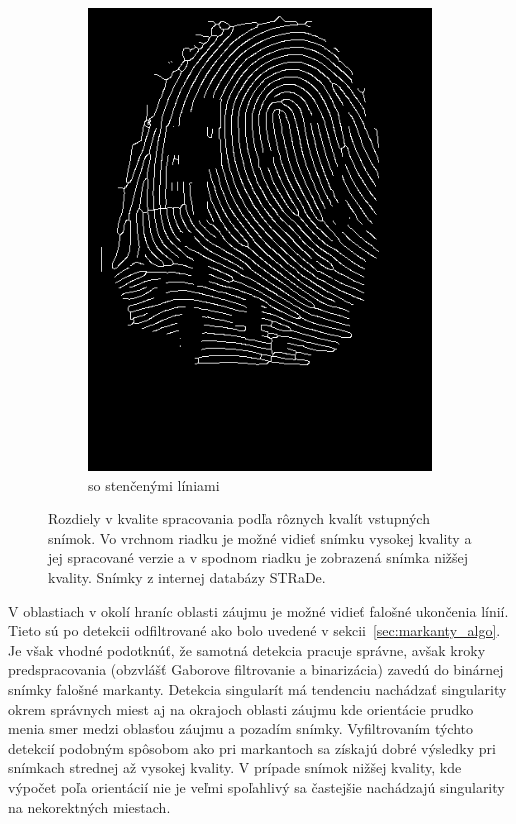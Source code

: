 \begin{figure}[h]
\begin{subfigure}[b]{0.3\linewidth}
      \includegraphics[width=\linewidth]{obrazky-figures/ecsema_thin.png}
      \caption{so stenčenými líniami}
    \end{subfigure}
    \caption{Rozdiely v kvalite spracovania podľa rôznych kvalít vstupných snímok. Vo vrchnom riadku je možné vidieť snímku vysokej kvality a jej spracované
    verzie a v spodnom riadku je zobrazená snímka nižšej kvality. Snímky z internej databázy STRaDe.}
    \label{obr:porovnanie_kvality}
  \end{figure}

  V oblastiach v okolí hraníc oblasti záujmu je možné vidieť falošné ukončenia línií. Tieto sú po detekcii odfiltrované ako bolo uvedené v
  sekcii~{\ref{sec:markanty_algo}}. Je však vhodné podotknúť, že samotná detekcia pracuje správne, avšak kroky
  predspracovania (obzvlášť Gaborove filtrovanie a binarizácia) zavedú do binárnej snímky falošné markanty.
  Detekcia singularít má tendenciu nachádzať singularity okrem správnych miest aj na okrajoch oblasti záujmu kde orientácie prudko menia smer medzi
  oblasťou záujmu a pozadím snímky. Vyfiltrovaním týchto detekcií podobným spôsobom ako pri markantoch sa získajú dobré výsledky pri snímkach strednej až
  vysokej kvality.
  V prípade snímok nižšej kvality, kde výpočet poľa orientácií nie je veľmi spoľahlivý sa častejšie nachádzajú singularity na nekorektných miestach.

